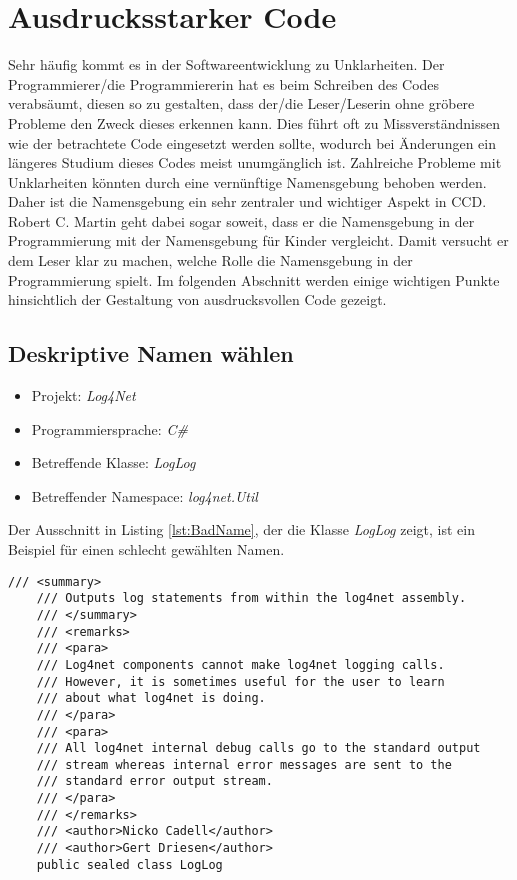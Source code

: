\section{Ausdrucksstarker Code}
Sehr häufig kommt es in der Softwareentwicklung zu Unklarheiten. Der Programmierer/die Programmiererin hat es beim Schreiben des Codes verabsäumt, diesen so zu gestalten, dass der/die Leser/Leserin ohne gröbere Probleme den Zweck dieses erkennen kann. Dies führt oft zu Missverständnissen wie der betrachtete Code eingesetzt werden sollte, wodurch bei Änderungen ein längeres Studium dieses Codes meist unumgänglich ist. Zahlreiche Probleme mit Unklarheiten könnten durch eine vernünftige Namensgebung behoben werden. Daher ist die Namensgebung ein sehr zentraler und wichtiger Aspekt in CCD. Robert C. Martin geht dabei sogar soweit, dass er die Namensgebung in der Programmierung mit der Namensgebung für Kinder vergleicht. Damit versucht er dem Leser klar zu machen, welche Rolle die Namensgebung in der Programmierung spielt. Im folgenden Abschnitt werden einige wichtigen Punkte hinsichtlich der Gestaltung von ausdrucksvollen Code gezeigt.

\subsection{Deskriptive Namen wählen}
\begin{itemize}
	\item Projekt: \textit{Log4Net}
	\item Programmiersprache: \textit{C\#}
	\item Betreffende Klasse: \textit{LogLog}
	\item Betreffender Namespace: \textit{log4net.Util}
\end{itemize}

\SuperPar Der Ausschnitt in Listing \ref{lst:BadName}, der die Klasse \textit{LogLog} zeigt, ist ein Beispiel für einen schlecht gewählten Namen.

\begin{lstlisting}[language={[Sharp]C}, caption=Beispiel für schlechte Namensgebung, label=lst:BadName]
/// <summary>
	/// Outputs log statements from within the log4net assembly.
	/// </summary>
	/// <remarks>
	/// <para>
	/// Log4net components cannot make log4net logging calls.
	/// However, it is sometimes useful for the user to learn 
	/// about what log4net is doing.
	/// </para>
	/// <para>
	/// All log4net internal debug calls go to the standard output 
	/// stream whereas internal error messages are sent to the 
	/// standard error output stream.
	/// </para>
	/// </remarks>
	/// <author>Nicko Cadell</author>
	/// <author>Gert Driesen</author>
	public sealed class LogLog
\end{lstlisting}

